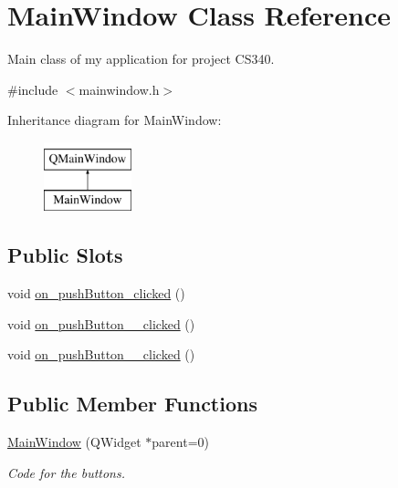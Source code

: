 \hypertarget{classMainWindow}{\section{Main\-Window Class Reference}
\label{classMainWindow}
}


Main class of my application for project C\-S340.  




{\ttfamily \#include $<$mainwindow.\-h$>$}

Inheritance diagram for Main\-Window\-:\begin{figure}[H]
\begin{center}
\leavevmode
\includegraphics[height=2.000000cm]{classMainWindow}
\end{center}
\end{figure}
\subsection*{Public Slots}
\begin{DoxyCompactItemize}
\item 
void \hyperlink{classMainWindow_a4de79c63c7fa0b8d7c468ac71f20be81}{on\-\_\-push\-Button\-\_\-clicked} ()
\item 
void \hyperlink{classMainWindow_ae0e46dc3da4ee07bf66e73e20300220c}{on\-\_\-push\-Button\-\_\-\_\-clicked} ()
\item 
void \hyperlink{classMainWindow_a12cf88402a93adef89645ba4e4cb7be1}{on\-\_\-push\-Button\-\_\-\_\-clicked} ()
\end{DoxyCompactItemize}
\subsection*{Public Member Functions}
\begin{DoxyCompactItemize}
\item 
\hyperlink{classMainWindow_a8b244be8b7b7db1b08de2a2acb9409db}{Main\-Window} (Q\-Widget $\ast$parent=0)
\begin{DoxyCompactList}\small\item\em Code for the buttons. \end{DoxyCompactList}\end{DoxyCompactItemize}


